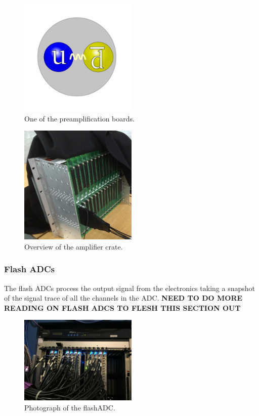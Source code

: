 \begin{figure}[!ht]
	\centering
	\includegraphics[width=0.5\textwidth]{ImgChap1/Meson2}
	\caption{One of the preamplification boards.}
	\label{PreAmp}
\end{figure}

\begin{figure}[!ht]
	\centering
	\includegraphics[width=0.5\textwidth]{ImgChap1/Board_hodoscope}
	\caption{Overview of the amplifier crate.}
	\label{ElectronicsCrate}
\end{figure}

\subsubsection*{Flash ADCs}

The flash ADCs process the output signal from the electronics taking a snapshot of the signal trace of all the channels in the ADC. \textbf{NEED TO DO MORE READING ON FLASH ADCS TO FLESH THIS SECTION OUT} 

\begin{figure}[!ht]
	\centering
	\includegraphics[width=0.5\textwidth]{ImgChap1/FlashADC}
	\caption{Photograph of the flashADC.}
	\label{FlashADC}
\end{figure}


